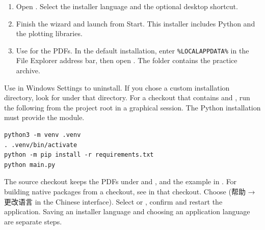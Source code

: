 \begin{enumerate}
\item Open . Select the installer language and the optional desktop shortcut.
\item Finish the wizard and launch  from Start. This installer includes Python and the plotting libraries.
\item Use  for the PDFs. In the default installation, enter \texttt{\%LOCALAPPDATA\%} in the File Explorer address bar, then open . The  folder contains the practice archive.
\end{enumerate}
Use  in Windows Settings to uninstall. If you chose a custom installation directory, look for  under that directory.
For a checkout that contains  and , run the following from the project root in a graphical session. The Python installation must provide the  module.
\begin{verbatim}
python3 -m venv .venv
. .venv/bin/activate
python -m pip install -r requirements.txt
python main.py
\end{verbatim}
The source checkout keeps the PDFs under  and , and the example in . For building native packages from a checkout, see  in that checkout.
Choose  (帮助 → 更改语言 in the Chinese interface). Select  or , confirm and restart the application. Saving an installer language and choosing an application language are separate steps.

